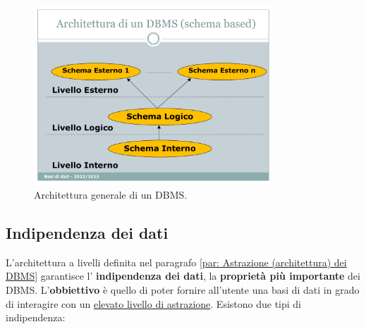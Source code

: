 \documentclass[a4paper]{article}
\begin{document}
	\begin{figure}[!htp]
		\centering
		\includegraphics[width=0.8\textwidth]{img/arch_DBMS.pdf}
		\caption{Architettura generale di un DBMS.}
	\end{figure}

	\newpage
	
	
	
	
	\subsection{Indipendenza dei dati}
	
	L'architettura a livelli definita nel paragrafo \ref{par: Astrazione (architettura) dei DBMS} garantisce l' \textcolor{Red3}{\textbf{indipendenza dei dati}}, la \textbf{proprietà più importante} dei DBMS. L'\textbf{obbiettivo} è quello di poter fornire all'utente una basi di dati in grado di interagire con un \underline{elevato livello di astrazione}. Esistono due tipi di indipendenza:
	
\end{document}
